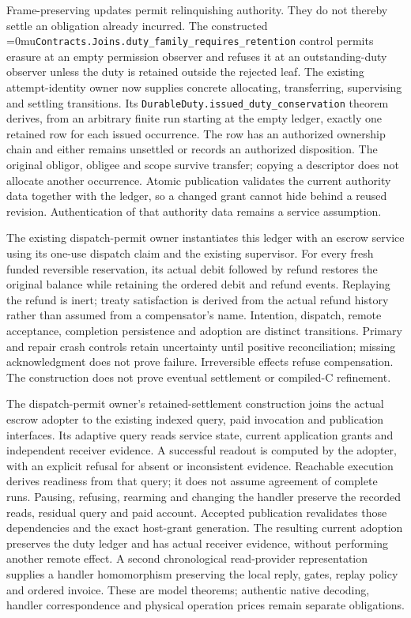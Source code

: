 \documentclass[11pt]{article}
\newcommand{\leanname}[1]{\textup{\Urlmuskip=0mu\relax\nolinkurl{#1}}}
\theoremstyle{definition}
\theoremstyle{remark}
\begin{document}
Frame-preserving updates permit relinquishing authority. They do not thereby
settle an obligation already incurred. The constructed
\leanname{Contracts.Joins.duty_family_requires_retention} control permits
erasure at an empty permission observer and refuses it at an outstanding-duty
observer unless the duty is retained outside the rejected leaf.
The existing attempt-identity owner now supplies concrete allocating,
transferring, supervising and settling transitions. Its
\nolinkurl{DurableDuty.issued_duty_conservation} theorem derives, from an
arbitrary finite run starting at the empty ledger, exactly one retained row
for each issued occurrence. The row has an authorized ownership chain and
either remains unsettled or records an authorized disposition. The original
obligor, obligee and scope survive transfer; copying a descriptor does not
allocate another occurrence. Atomic publication validates the current
authority data together with the ledger, so a changed grant cannot hide
behind a reused revision. Authentication of that authority data remains a
service assumption.

The existing dispatch-permit owner instantiates this ledger with an escrow
service using its one-use dispatch claim and the existing supervisor. For
every fresh funded reversible reservation, its actual debit followed by
refund restores the original balance while retaining the ordered debit and
refund events. Replaying the refund is inert; treaty satisfaction is derived
from the actual refund history rather than assumed from a compensator's
name. Intention, dispatch, remote acceptance, completion persistence and
adoption are distinct transitions. Primary and repair crash controls retain
uncertainty until positive reconciliation; missing acknowledgment does not
prove failure. Irreversible effects refuse compensation. The construction
does not prove eventual settlement or compiled-C refinement.

The dispatch-permit owner's retained-settlement construction joins the actual
escrow adopter to the existing indexed query, paid invocation and publication
interfaces. Its adaptive query reads service state, current application grants
and independent receiver evidence. A successful readout is computed by the
adopter, with an explicit refusal for absent or inconsistent evidence. Reachable
execution derives readiness from that query; it does not assume agreement of
complete runs. Pausing, refusing, rearming and changing the handler preserve the
recorded reads, residual query and paid account. Accepted publication revalidates
those dependencies and the exact host-grant generation. The resulting current
adoption preserves the duty ledger and has actual receiver evidence, without
performing another remote effect. A second chronological read-provider
representation supplies a handler homomorphism preserving the local reply,
gates, replay policy and ordered invoice. These are model theorems; authentic
native decoding, handler correspondence and physical operation prices remain
separate obligations.
\end{document}
